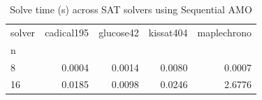 \begin{table}
\caption{Solve time (s) across SAT solvers using Sequential AMO}
\begin{tabular}{lrrrr}
\toprule
solver & cadical195 & glucose42 & kissat404 & maplechrono \\
n &  &  &  &  \\
\midrule
8 & 0.0004 & 0.0014 & 0.0080 & 0.0007 \\
16 & 0.0185 & 0.0098 & 0.0246 & 2.6776 \\
\bottomrule
\end{tabular}
\end{table}
